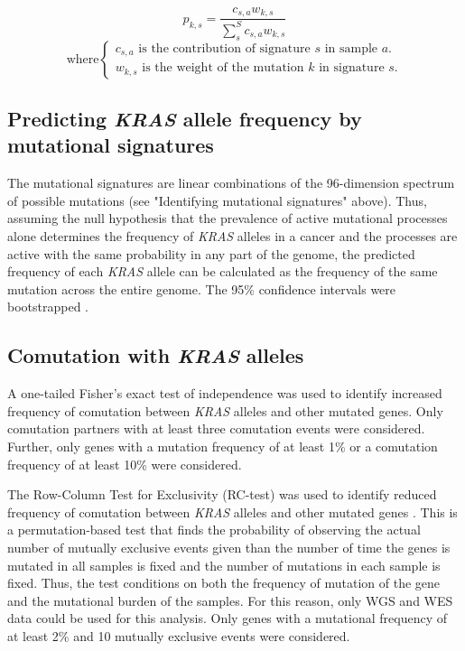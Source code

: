 \documentclass[english, 10pt, letterpaper]{article}
\newcommand{\KRAS}{\emph{KRAS}}
\begin{document}
\begin{equation}
\label{eq:kras_mutation_from_signature}
p_{k,s} = \frac{c_{s,a} w_{k,s}}{\sum_{s}^{S} c_{s,a} w_{k,s}}
\end{equation}
\begin{equation*}
    \text{where} 
    \begin{cases}
        c_{s,a} \text{ is the contribution of signature $s$ in sample $a$.} \\
        w_{k,s} \text{ is the weight of the mutation $k$ in signature $s$.}
    \end{cases}
\end{equation*}


\subsection*{Predicting \KRAS{} allele frequency by mutational signatures}

The mutational signatures are linear combinations of the 96-dimension spectrum of possible mutations (see "Identifying mutational signatures" above).
Thus, assuming the null hypothesis that the prevalence of active mutational processes alone determines the frequency of \KRAS{} alleles in a cancer and the processes are active with the same probability in any part of the genome, the predicted frequency of each \KRAS{} allele can be calculated as the frequency of the same mutation across the entire genome.
The 95\% confidence intervals were bootstrapped \cite{R-boot}.


\subsection*{Comutation with \KRAS{} alleles}

A one-tailed Fisher’s exact test of independence was used to identify increased frequency of comutation between \KRAS{} alleles and other mutated genes. Only comutation partners with at least three comutation events were considered. Further, only genes with a mutation frequency of at least 1\% or a comutation frequency of at least 10\% were considered. 

The Row-Column Test for Exclusivity (RC-test) was used to identify reduced frequency of comutation between \KRAS{} alleles and other mutated genes \cite{Leiserson2016}. 
This is a permutation-based test that finds the probability of observing the actual number of mutually exclusive events given than the number of time the genes is mutated in all samples is fixed and the number of mutations in each sample is fixed.
Thus, the test conditions on both the frequency of mutation of the gene and the mutational burden of the samples.
For this reason, only WGS and WES data could be used for this analysis.
Only genes with a mutational frequency of at least 2\% and 10 mutually exclusive events were considered.
\end{document}
